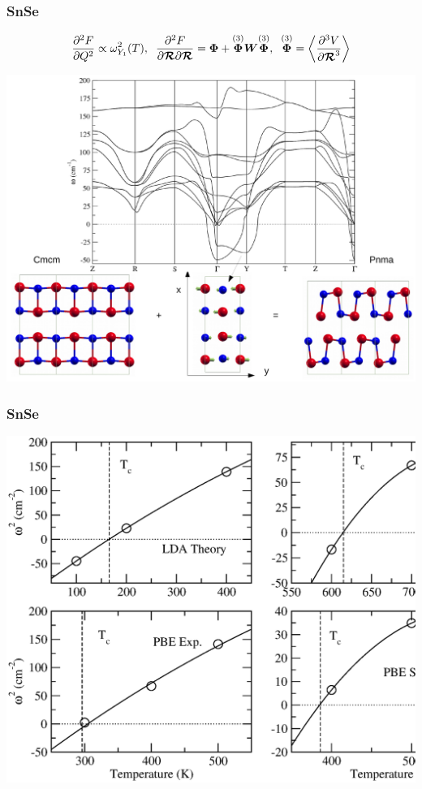 \documentclass{beamer}
\begin{document}
\begin{frame}

\frametitle{SnSe}
\begin{equation}
  \frac{\partial^{2}F}{\partial Q^{2}}\propto\omega_{Y_{1}}^{2}(T), \hspace{0.2cm} \frac{\partial^{2}F}{\partial\boldsymbol{\mathcal{
  R}}\partial\boldsymbol{\mathcal{R}}}=\boldsymbol{\Phi}+\overset{(3)}{\boldsymbol{\Phi}}\boldsymbol{W}\overset{(3)}{\boldsymbol{\Phi}},
  \hspace{0.2cm} \overset{(3)}{\boldsymbol{\Phi}}=\left\langle\frac{\partial^{3}V}{\partial\boldsymbol{\mathcal{R}}^{3}}\right\rangle
 \nonumber
 \end{equation}
\begin{center}
  \includegraphics[width=0.7\linewidth]{Pictures/SnSe/figure3.pdf}
\end{center}

\end{frame}


\begin{frame}

\frametitle{SnSe}
\begin{center}
  \includegraphics[width=0.85\linewidth]{Pictures/SnSe/freq-main.eps}
\end{center}

\end{frame}
\end{document}

